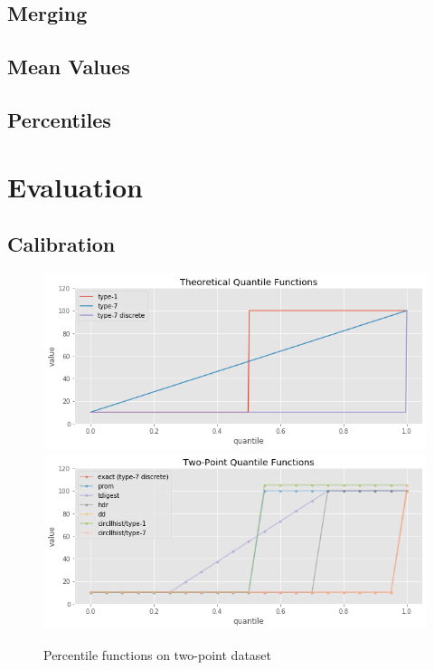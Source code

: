 \documentclass{article}
\theoremstyle{plain}
\theoremstyle{remark}
\begin{document}
\subsection{Merging}

\subsection{Mean Values}

\subsection{Percentiles}

\section{Evaluation}

\clearpage
\subsection{Calibration}

\begin{figure}
   \includegraphics[width=\textwidth]{evaluation/images/quantile_comparison.png}
   \includegraphics[width=\textwidth]{evaluation/images/Two_Points_quantile_comparison.png}
   \caption{Percentile functions on two-point dataset}
\end{figure}
\end{document}
